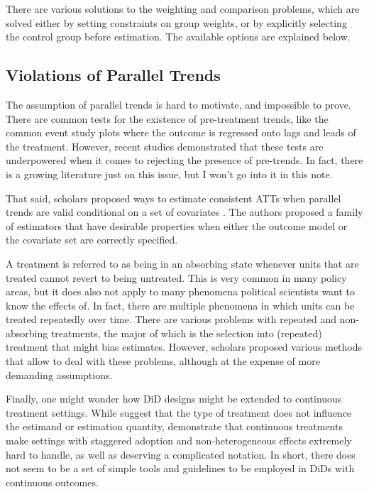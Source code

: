 \documentclass[hidelinks]{article}\usepackage[]{graphicx}\usepackage[]{color}
\begin{document}
There are various solutions to the weighting and comparison problems, which are solved either by setting constraints on group weights, or by explicitly selecting the control group before estimation. The available options are explained below.

\subsection{Violations of Parallel Trends}

The assumption of parallel trends is hard to motivate, and impossible to prove. There are common tests for the existence of pre-treatment trends, like the common event study plots where the outcome is regressed onto lags and leads of the treatment. However, recent studies demonstrated that these tests are underpowered when it comes to rejecting the presence of pre-trends. In fact, there is a growing literature just on this issue, but I won't go into it in this note.

That said, scholars proposed ways to estimate consistent ATTs when parallel trends are valid conditional on a set of covariates \parencite{SantAnna2020}. The authors proposed a family of estimators that have desirable properties when either the outcome model or the covariate set are correctly specified.



A treatment is referred to as being in an absorbing state whenever units that are treated cannot revert to being untreated. This is very common in many policy areas, but it does also not apply to many phenomena political scientists want to know the effects of. In fact, there are multiple phenomena in which units can be treated repeatedly over time. There are various problems with repeated and non-absorbing treatments, the major of which is the selection into (repeated) treatment that might bias estimates. However, scholars proposed various methods that allow to deal with these problems, although at the expense of more demanding assumptions.

Finally, one might wonder how DiD designs might be extended to continuous treatment settings. While \textcite{Angrist2009} suggest that the type of treatment does not influence the estimand or estimation quantity, \textcite{Callaway2021} demonstrate that continuous treatments make settings with staggered adoption and non-heterogeneous effects extremely hard to handle, as well as deserving a complicated notation. In short, there does not seem to be a set of simple tools and guidelines to be employed in DiDs with continuous outcomes.
\end{document}
